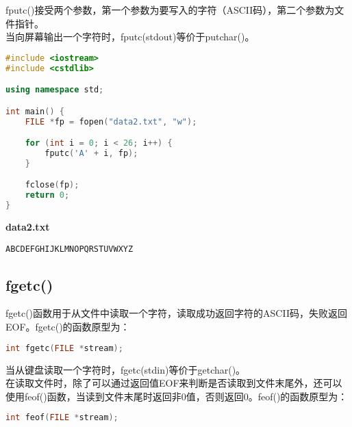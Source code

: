 fputc()接受两个参数，第一个参数为要写入的字符（ASCII码），第二个参数为文件指针。\\

当向屏幕输出一个字符时，fputc(stdout)等价于putchar()。\\


\begin{lstlisting}[language=C++]
#include <iostream>
#include <cstdlib>

using namespace std;

int main() {
    FILE *fp = fopen("data2.txt", "w");

    for (int i = 0; i < 26; i++) {
        fputc('A' + i, fp);
    }

    fclose(fp);
    return 0;
}
\end{lstlisting}

\begin{tcolorbox}
    \textbf{data2.txt}
    \begin{verbatim}
ABCDEFGHIJKLMNOPQRSTUVWXYZ
	\end{verbatim}
\end{tcolorbox}

\vspace{0.5cm}

\subsection{fgetc()}

fgetc()函数用于从文件中读取一个字符，读取成功返回字符的ASCII码，失败返回EOF。fgetc()的函数原型为：

\vspace{-0.5cm}

\begin{lstlisting}[language=C++]
int fgetc(FILE *stream);
\end{lstlisting}

当从键盘读取一个字符时，fgetc(stdin)等价于getchar()。\\

在读取文件时，除了可以通过返回值EOF来判断是否读取到文件末尾外，还可以使用feof()函数，当读到文件末尾时返回非0值，否则返回0。feof()的函数原型为：

\vspace{-0.5cm}

\begin{lstlisting}[language=C++]
int feof(FILE *stream);
\end{lstlisting}


